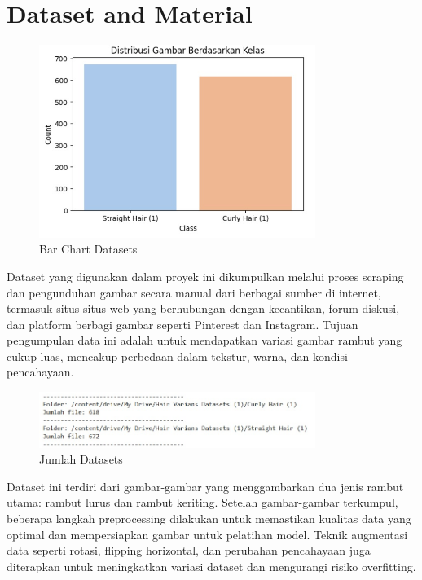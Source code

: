 \documentclass[12pt,a4paper]{article}
\begin{document}
\section{Dataset and Material}

\begin{figure}[h]  
    \centering  
    \includegraphics[width=0.8\textwidth]{images/eda3.jpeg}  
    \caption{Bar Chart Datasets}  
    \label{fig:gambar}  
\end{figure}

Dataset yang digunakan dalam proyek ini dikumpulkan melalui proses scraping dan pengunduhan gambar secara manual dari berbagai sumber di internet, termasuk situs-situs web yang berhubungan dengan kecantikan, forum diskusi, dan platform berbagi gambar seperti Pinterest dan Instagram. Tujuan pengumpulan data ini adalah untuk mendapatkan variasi gambar rambut yang cukup luas, mencakup perbedaan dalam tekstur, warna, dan kondisi pencahayaan. 

\begin{figure}[h]  
    \centering  
    \includegraphics[width=0.8\textwidth]{images/eda.jpeg}  
    \caption{Jumlah Datasets}  
    \label{fig:gambar}  
\end{figure}

Dataset ini terdiri dari gambar-gambar yang menggambarkan dua jenis rambut utama: rambut lurus dan rambut keriting. Setelah gambar-gambar terkumpul, beberapa langkah preprocessing dilakukan untuk memastikan kualitas data yang optimal dan mempersiapkan gambar untuk pelatihan model. Teknik augmentasi data seperti rotasi, flipping horizontal, dan perubahan pencahayaan juga diterapkan untuk meningkatkan variasi dataset dan mengurangi risiko overfitting. 
\end{document}
